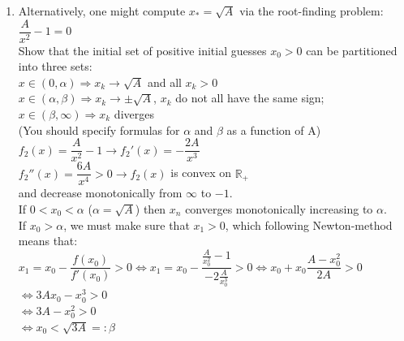 \documentclass[14pt,a4paper]{article}
\begin{document}
\begin{enumerate}
	
	\label{3b}
	\item Alternatively, one might compute $x_* = \sqrt{A}$ via the root-finding problem: $\dfrac{A}{x^2} -1 = 0$\\
	Show that the initial set of positive initial guesses $x_0 > 0$ can be partitioned into three sets:\\
	\hspace*{2cm} $x \in (0,\alpha) \Rightarrow x_k \rightarrow \sqrt{A}$ and all $x_k > 0$\\
	\hspace*{2cm} $x \in (\alpha, \beta) \Rightarrow x_k \rightarrow \pm \sqrt{A}$, $x_k$ do not all have the same sign;\\
	\hspace*{2cm} $x \in (\beta, \infty) \Rightarrow x_k $ diverges\\
	(You should specify formulas for $\alpha$ and $\beta$ as a function of A)\\
	\hspace*{2cm}	$f_2(x) = \dfrac{A}{x^2} - 1 \rightarrow f_2'(x) = -\dfrac{2A}{x^3}$\\
	\hspace*{5.3cm}	$f_2''(x) = \dfrac{6A}{x^4} > 0 \rightarrow f_2(x)$ is convex on $\mathbb{R}_+$ \\
	and decrease monotonically from $\infty$ to $-1$. \\
	If $0 < x_0 < \alpha$ ($\alpha = \sqrt{A}$) then $x_n$ converges monotonically increasing to $\alpha$.\\
	If $x_0 > \alpha$, we must make sure that $x_1 > 0$, which following Newton-method means that: \\
	$ x_1 = x_0 - \dfrac{f(x_0)}{f'(x_0)} > 0 \Leftrightarrow x_1 = x_0 - \dfrac{\frac{A}{x_0^2} -1}{-2\frac{A}{x_0^3}} > 0 \Leftrightarrow x_0 + x_0\dfrac{A - x_0^2}{2A} > 0 $\\
	\hspace*{8.3cm} $\Leftrightarrow 3Ax_0 - x_0^3 > 0 $\\
	\hspace*{8.3cm} $\Leftrightarrow 3A - x_0^2 > 0 $\\
	\hspace*{8.3cm} $\Leftrightarrow x_0 < \sqrt{3A} =: \beta$\\
	

\end{enumerate}
\end{document}
